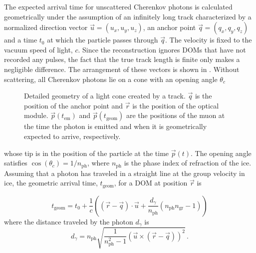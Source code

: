 The expected arrival time for unscattered Cherenkov photons is calculated geometrically under the assumption of an infinitely long track characterized by a normalized direction vector $\vec{u}=(u_{x},u_{y},u_{z})$,
an anchor point $\vec{q}=(q_{x},q_{y},q_{z})$ and a time $t_{0}$
at which the particle passes through $\vec{q}$. The
velocity is fixed to the vacuum speed of light, $c$. Since the reconstruction ignores DOMs that have not recorded any pulses, the fact that the true track length is finite only makes a negligible  difference. The arrangement of these vectors is shown in .
Without scattering, all Cherenkov photons lie on a cone with an opening
angle $\theta_{c}$
\begin{figure}[h]
\begin{centering}
\par
\end{centering}
\caption{\label{fig:Detailed-track-geometry}Detailed geometry of a light cone
created by a track. $\vec{q}$ is the position of the anchor point
and $\vec{r}$ is the position of the optical module. $\vec{p}(t_{\mathrm{em}})$
and $\vec{p}(t_{\mathrm{geom}})$ are the positions of the muon at
the time the photon is emitted and when it is geometrically expected
to arrive, respectively.}
\end{figure}
whose tip is in the position of the particle at the time $\vec{p}(t)$. The opening angle satisfies $\cos(\theta_c)=1/n_{\mathrm{ph}}$, where $n_{\mathrm{ph}}$ is the phase index of refraction of the ice.
Assuming that a photon has traveled in a straight line at the group velocity in ice, the geometric arrival time, $t_{\mathrm{geom}}$, for a DOM at position $\vec{r}$ is

\begin{equation}
t_{\mathrm{geom}}=t_{0}+\frac{1}{c}\left(\left(\vec{r}-\vec{q}\right)\cdot\vec{u}+\frac{d_{\gamma}}{n_{\mathrm{ph}}}\left(n_{\mathrm{ph}}n_{\mathrm{gr}}-1\right)\right)\label{eq:t_geom-MS-track}
\end{equation}
where the distance traveled by the photon $d_\gamma$ is
\begin{equation}
d_{\gamma}=n_{\mathrm{ph}}\sqrt{\frac{1}{n_{\mathrm{ph}}^{2}-1}\left(\vec{u}\times\left(\vec{r}-\vec{q}\right)\right)^{2}}\,.\label{eq:photon-distance-3d}
\end{equation}

